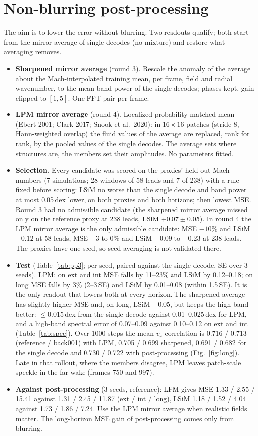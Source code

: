 \documentclass[10pt]{article}
\begin{document}
\section*{Non-blurring post-processing}
The aim is to lower the error without blurring. Two readouts qualify; both start from the mirror
average of single decodes (no mixture) and restore what averaging removes.
\begin{itemize}\itemsep1pt
\item \textbf{Sharpened mirror average} (round 3). Rescale the anomaly of the average about the
  Mach-interpolated training mean, per frame, field and radial wavenumber, to the mean band power of
  the single decodes; phases kept, gain clipped to $[1,5]$. One FFT pair per frame.
\item \textbf{LPM mirror average} (round 4). Localized probability-matched mean (Ebert 2001; Clark
  2017; Snook et al.\ 2020): in $16\times16$ patches (stride 8, Hann-weighted overlap) the fluid
  values of the average are replaced, rank for rank, by the pooled values of the single decodes.
  The average sets where structures are, the members set their amplitudes. No parameters fitted.
\item \textbf{Selection.} Every candidate was scored on the proxies' held-out Mach numbers (7
  simulations; 28 windows of 58 leads and 7 of 238) with a rule fixed before scoring: LSiM no worse
  than the single decode and band power at most 0.05\,dex lower, on both proxies and both horizons;
  then lowest MSE. Round 3 had no admissible candidate (the sharpened mirror average missed only on
  the reference proxy at 238 leads, LSiM $+0.07\pm0.05$). In round 4 the LPM mirror average is the
  only admissible candidate: MSE $-10\%$ and LSiM $-0.12$ at 58 leads, MSE $-3$ to $0\%$ and LSiM
  $-0.09$ to $-0.23$ at 238 leads. The proxies have one seed, so seed averaging is not validated there.
\item \textbf{Test} (Table~\ref{tab:pp3}; per seed, paired against the single decode, SE over 3
  seeds). LPM: on ext and int MSE falls by 11--23\% and LSiM by 0.12--0.18; on long MSE falls by 3\%
  (2--3\,SE) and LSiM by 0.01--0.08 (within 1.5\,SE). It is the only readout that lowers both at
  every horizon. The sharpened average has slightly higher MSE and, on long, LSiM $+0.05$, but keeps
  the high band better: $\le0.015$\,dex from the single decode against 0.01--0.025\,dex for LPM, and a
  high-band spectral error of 0.07--0.09 against 0.10--0.12 on ext and int (Table~\ref{tab:spec}).
  Over 1000 steps the mean $v_x$ correlation is 0.716 / 0.713 (reference / back001) with LPM, 0.705 /
  0.699 sharpened, 0.691 / 0.682 for the single decode and 0.730 / 0.722 with post-processing
  (Fig.~\ref{fig:long}). Late in that rollout, where the members disagree, LPM leaves patch-scale
  speckle in the far wake (frames 750 and 997).
\item \textbf{Against post-processing} (3 seeds, reference): LPM gives MSE 1.33 / 2.55 / 15.41 against
  1.31 / 2.45 / 11.87 (ext / int / long), LSiM 1.18 / 1.52 / 4.04 against 1.73 / 1.86 / 7.24. Use
  the LPM mirror average when realistic fields matter. The long-horizon MSE gain of post-processing
  comes only from blurring.
\end{itemize}
\end{document}
